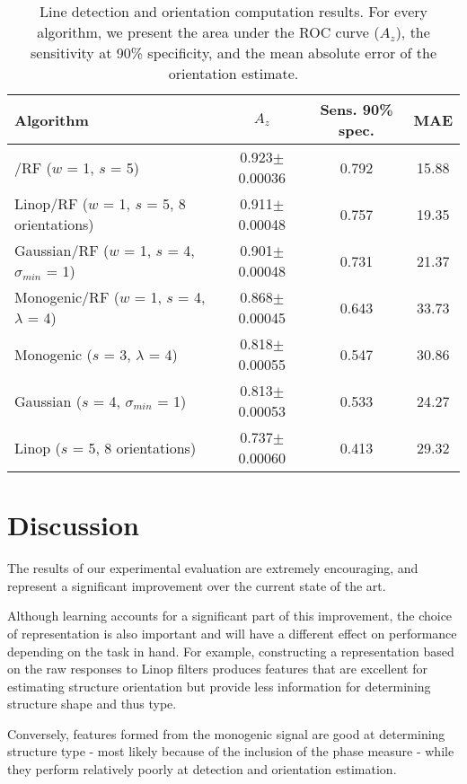 \begin{table}
\centering
\caption{Line detection and orientation computation results. For every algorithm, we present the area under the ROC curve ($A_z$), the sensitivity at 90\% specificity, and the mean absolute error of the orientation estimate.}
\label{t:line_detection}
%
\begin{tabular}{l c c c}
Algorithm	
		& $A_z$							& Sens. \@ 90\% spec. & MAE \\
\hline
\dtcwt{}/RF ($w$ = 1, $s$ = 5)												
		& 0.923$\pm$0.00036	& 0.792 							& 15.88 \\
Linop/RF ($w$ = 1, $s$ = 5, 8 orientations)				
		& 0.911$\pm$0.00048	& 0.757								& 19.35 \\
Gaussian/RF ($w$ = 1, $s$ = 4, $\sigma_{min}$ = 1)
		& 0.901$\pm$0.00048	& 0.731								& 21.37 \\
Monogenic/RF ($w$ = 1, $s$ = 4, $\lambda$ = 4)
		& 0.868$\pm$0.00045	& 0.643								& 33.73 \\
Monogenic ($s$ = 3, $\lambda$ = 4)									
		& 0.818$\pm$0.00055	& 0.547								& 30.86 \\
Gaussian ($s$ = 4, $\sigma_{min}$ = 1)							
		& 0.813$\pm$0.00053	& 0.533								& 24.27 \\
Linop ($s$ = 5, 8 orientations)										
		& 0.737$\pm$0.00060	& 0.413								& 29.32 \\
\end{tabular}
\end{table}



\section{Discussion}
The results of our experimental evaluation are extremely encouraging, and represent a significant improvement over the current state of the art. 

Although learning accounts for a significant part of this improvement, the choice of representation is also important and will have a different effect on performance depending on the task in hand. For example, constructing a representation based on the raw responses to Linop filters produces features that are excellent for estimating structure orientation but provide less information for determining structure shape and thus type. 

Conversely, features formed from the monogenic signal are good at determining structure type - most likely because of the inclusion of the phase measure - while they perform relatively poorly at detection and orientation estimation. 

